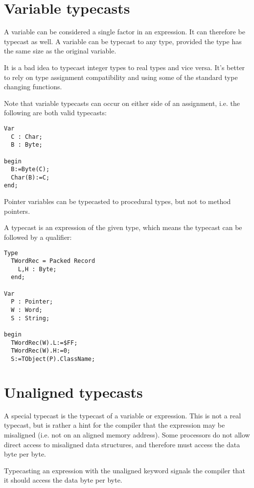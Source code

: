\section{Variable typecasts}
A variable can be considered a single factor in an expression. It can
therefore be typecast as well. A variable can be typecast to any type,
provided the type has the same size as the original variable. 

It is a bad idea to typecast integer types to real types and vice versa.
It's better to rely on type assignment compatibility and using some of the
standard type changing functions.

Note that variable typecasts can occur on either side of an assignment,
i.e. the following are both valid typecasts:
\begin{verbatim}
Var
  C : Char;
  B : Byte;

begin
  B:=Byte(C);
  Char(B):=C;
end;
\end{verbatim}
Pointer variables can be typecasted to procedural types, but not
to method pointers.

A typecast is an expression of the given type, which means the
typecast can be followed by a qualifier:
\begin{verbatim}
Type 
  TWordRec = Packed Record
    L,H : Byte;
  end;

Var
  P : Pointer;
  W : Word;
  S : String;

begin
  TWordRec(W).L:=$FF;
  TWordRec(W).H:=0;
  S:=TObject(P).ClassName;
\end{verbatim}

\section{Unaligned typecasts}
A special typecast is the  typecast of a variable or
expression. This is not a real typecast, but is rather a hint for the 
compiler that the expression may be misaligned (i.e. not on an aligned
memory address). Some processors do not allow direct access to misaligned
data structures, and therefore must access the data byte per byte.

Typecasting an expression with the unaligned keyword signals the compiler
that it should access the data byte per byte.

